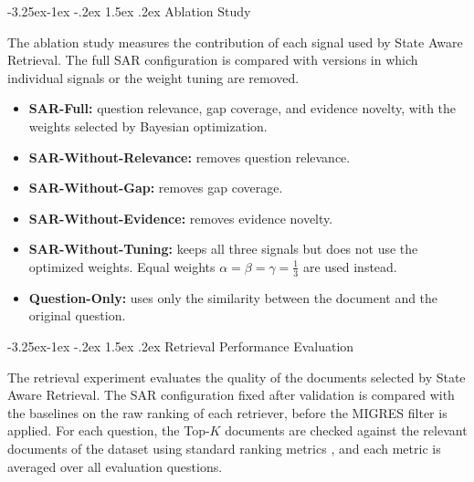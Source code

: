 \documentclass[12pt,a4paper]{report}
\makeatletter
\renewcommand\subsection{\@startsection{subsection}{2}{\z@}%
    {-3.25ex\@plus -1ex \@minus -.2ex}%
    {1.5ex \@plus .2ex}%
    {\normalfont\fontsize{14}{17}\selectfont\bfseries}}
\makeatother
\begin{document}
\subsection{Ablation Study}

The ablation study measures the contribution of each signal used by State Aware Retrieval. The full SAR configuration is compared with versions in which individual signals or the weight tuning are removed.

\begin{itemize}[leftmargin=0.25in,itemsep=0.06in,parsep=0pt]
\item \textbf{SAR-Full:} question relevance, gap coverage, and evidence novelty, with the weights selected by Bayesian optimization.
\item \textbf{SAR-Without-Relevance:} removes question relevance.
\item \textbf{SAR-Without-Gap:} removes gap coverage.
\item \textbf{SAR-Without-Evidence:} removes evidence novelty.
\item \textbf{SAR-Without-Tuning:} keeps all three signals but does not use the optimized weights. Equal weights $\alpha=\beta=\gamma=\tfrac{1}{3}$ are used instead.
\item \textbf{Question-Only:} uses only the similarity between the document and the original question.
\end{itemize}

\subsection{Retrieval Performance Evaluation}

The retrieval experiment evaluates the quality of the documents selected by State Aware Retrieval. The SAR configuration fixed after validation is compared with the baselines on the raw ranking of each retriever, before the MIGRES filter is applied. For each question, the Top-$K$ documents are checked against the relevant documents of the dataset using standard ranking metrics \cite{manning2008ir}, and each metric is averaged over all evaluation questions.
\end{document}

